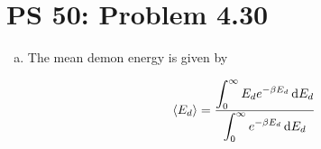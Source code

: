 \documentclass[12pt,a4paper,twocolumn]{article}
\newcommand\ddfrac[2]{\frac{\displaystyle #1}{\displaystyle #2}}
\begin{document}
\setcounter{page}{1}

\section*{PS 50: Problem 4.30}
\bigskip

\begin{enumerate}[(a)]

\item The mean demon energy is given by

\begin{equation}
	\ev{E_d} = \ddfrac{\int_0^\infty E_d e^{-\beta E_d} \dd{E_d}}{\int_0^\infty e^{-\beta E_d} \dd{E_d}} \label{eq:demon-energy}
\end{equation}

\end{enumerate}
\end{document}
